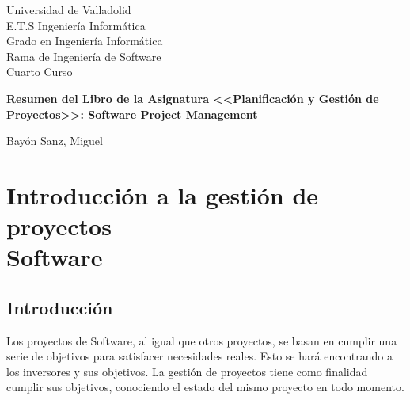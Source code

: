 \documentclass[12pt]{article}
\begin{document}
\begin{titlepage}
\begin{flushright}
\hfill\parbox[r][][c]{0.5\textwidth}{
{\fontsize{14}{14}\selectfont Universidad de Valladolid \\
E.T.S Ingeniería Informática \\
Grado en Ingeniería Informática\\
Rama de Ingeniería de Software\\
Cuarto Curso}}

\end{flushright}

\vfill
\centering
{\fontsize{16pt}{1cm}\selectfont \textbf{Resumen del Libro de la Asignatura <<Planificación y Gestión de Proyectos>>: Software Project Management}}


\vfill
\begin{flushright}
\hfill\parbox[r][][c]{0.4\textwidth}{
{\fontsize{14pt}{14cm}\selectfont
Bayón Sanz, Miguel
}
}
\end{flushright}

\end{titlepage}

\tableofcontents
\newpage


\newpage
\section{Introducción a la gestión de proyectos\\ Software}
\label{1.0.0}
\subsection{Introducción}
\label{1.1.0}

{Los proyectos de Software, al igual que otros proyectos, se basan en cumplir una serie de objetivos para satisfacer necesidades reales. Esto se hará encontrando a los inversores y sus objetivos. La gestión de proyectos tiene como finalidad cumplir sus objetivos, conociendo el estado del mismo proyecto en todo momento.}
\end{document}
